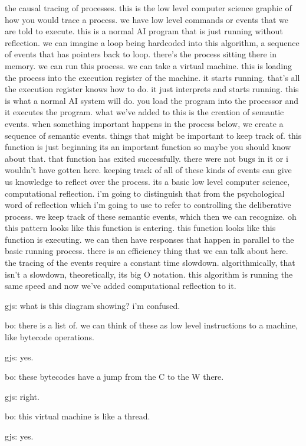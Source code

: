 the causal tracing of processes.
this is the low level computer science graphic of how you would trace a process.
we have low level commands or events that we are told to execute.
this is a normal AI program that is just running without reflection.
we can imagine a loop being hardcoded into this algorithm, a sequence of events that has pointers back to loop.
there's the process sitting there in memory.
we can run this process.
we can take a virtual machine.
this is loading the process into the execution register of the machine.
it starts running.
that's all the execution register knows how to do.
it just interprets and starts running.
this is what a normal AI system will do.
you load the program into the processor and it executes the program.
what we've added to this is the creation of semantic events.
when something important happens in the process below, we create a sequence of semantic events.
things that might be important to keep track of.
this function is just beginning its an important function so maybe you should know about that.
that function has exited successfully.
there were not bugs in it or i wouldn't have gotten here.
keeping track of all of these kinds of events can give us knowledge to reflect over the process.
its a basic low level computer science, computational reflection.
i'm going to distinguish that from the psychological word of reflection which i'm going to use to refer to controlling the deliberative process.
we keep track of these semantic events, which then we can recognize.
oh this pattern looks like this function is entering.
this function looks like this function is executing.
we can then have responses that happen in parallel to the basic running process.
there is an efficiency thing that we can talk about here.
the tracing of the events require a constant time slowdown.
algorithmically, that isn't a slowdown, theoretically, its big O notation.
this algorithm is running the same speed and now we've added computational reflection to it.

gjs: what is this diagram showing?
i'm confused.

bo: there is a list of.  we can think of these as low level instructions to a machine, like bytecode operations.

gjs: yes.

bo: these bytecodes have a jump from the C to the W there.

gjs: right.

bo: this virtual machine is like a thread.

gjs: yes.

